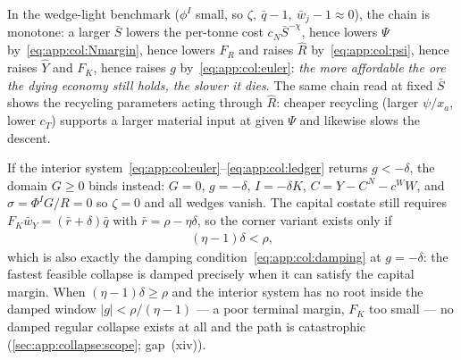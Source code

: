  In the wedge-light benchmark ($\phi^I$ small,
so $\zeta,\ \bar q-1,\ \bar w_j-1\approx0$), the chain is monotone: a larger $\bar S$ lowers
the per-tonne cost $c_N\bar S^{-\chi}$, hence lowers $\Psi$
by~\eqref{eq:app:col:Nmargin}, hence lowers $F_R$ and raises $\hat R$
by~\eqref{eq:app:col:psi}, hence raises $\hat Y$ and $F_K$, hence raises $g$
by~\eqref{eq:app:col:euler}: \emph{the more affordable the ore the dying economy still holds,
the slower it dies}. The same chain read at fixed $\bar S$ shows the recycling parameters
acting through $\hat R$: cheaper recycling (larger $\psi/x_a$, lower $c_T$) supports a larger
material input at given $\Psi$ and likewise slows the descent.

 If the interior
system~\eqref{eq:app:col:euler}--\eqref{eq:app:col:ledger} returns $g<-\delta$, the domain
$G\ge0$ binds instead: $G=0$, $g=-\delta$, $I=-\delta K$, $C=Y-C^N-c^WW$, and
$\sigma=\Phi^IG/R=0$ so $\zeta=0$ and all wedges vanish. The capital costate still requires
$F_K\bar w_Y=\left(\bar r+\delta\right)\bar q$ with $\bar r=\rho-\eta\delta$, so the corner
variant exists only if
\begin{align}
\left(\eta-1\right)\delta<\rho ,
\label{eq:app:col:cornercond}
\end{align}
which is also exactly the damping condition~\eqref{eq:app:col:damping} at $g=-\delta$: the
fastest feasible collapse is damped precisely when it can satisfy the capital margin. When
$\left(\eta-1\right)\delta\ge\rho$ and the interior system has no root inside the damped
window $\left|g\right|<\rho/\left(\eta-1\right)$ --- a poor terminal margin, $F_K$ too small
--- no damped regular collapse exists at all and the path is catastrophic
(\ref{sec:app:collapse:scope}; gap~(xiv)).

